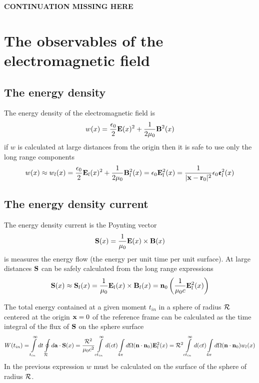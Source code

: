 {\bf{\color{red} CONTINUATION MISSING HERE}}

\section{The observables of the electromagnetic field}

\subsection{The energy density}
The energy density of the electromagnetic field is
\begin{align}
    w (x)=\frac{\epsilon_0}{2}{\bf E}(x)^2+\frac1{2\mu_0}{\bf B}^2(x)
\end{align}
if $w$ is calculated at large distances from the origin then it is safe to use only the long range components
\begin{align}
    w (x)\approx w_l(x) =\frac{\epsilon_0}{2}{\bf E}_l(x)^2+\frac1{2\mu_0}{\bf B}_l^2(x)=\epsilon_0{\bf E}_l^2(x)=\frac1{|{\bf x} - {\bf r}_0|^2}\epsilon_0{\boldsymbol{\mathfrak e}}^2_l(x)
\end{align}

\subsection{The energy density current}

The energy density current is the Poynting vector
\begin{align}
    {\bf S}(x)=\frac1{\mu_0}{\bf E}(x)\times{\bf B}(x)
\end{align}
is measures the energy flow (the energy per unit time per unit surface).
At large distances ${\bf S}$ can be safely calculated from the long range expressions
\begin{align}
    {\bf S}(x)\approx{\bf S}_l(x) = \frac1{\mu_0}{\bf E}_l(x)\times{\bf B}_l(x)={\bf n}_0\left(\frac1{\mu_0c}{\bf E}_l^2(x)\right)
\end{align}

The total energy contained at a given moment $t_{in}$ in a sphere of radius ${\cal R}$ centered at the origin ${\bf x}=0$ of the reference frame can be calculated as the time integral of the flux of ${\bf S}$ on the sphere surface
\begin{align}
    W(t_{in})=\int\limits_{t_{in}}^{\infty}dt\oint\limits_{\cal R}d{\bf a}\cdot{\bf S}(x)=\frac{{\cal R}^2}{\mu_0c^2} \int\limits_{ct_{in}}^{\infty}d(ct)\int\limits_{4\pi}d\Omega ({\bf n}\cdot{\bf n}_0){\bf E}_l^2(x)= {\cal R}^2\int\limits_{ct_{in}}^{\infty}d(ct)\int\limits_{4\pi}d\Omega ({\bf n}\cdot{\bf n}_0)w_l(x)
\end{align}
In the previous expression $w$ must be calculated on the surface of the sphere of radius ${\cal R}$.

